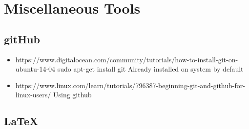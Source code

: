 \documentclass[12pt]{article}
\begin{document}
\section{Miscellaneous Tools}
	\subsection{gitHub}
	\begin{itemize}
		\item https://www.digitalocean.com/community/tutorials/how-to-install-git-on-ubuntu-14-04
		\subitem sudo apt-get install git
		\subitem Already installed on system by default
		\item https://www.linux.com/learn/tutorials/796387-beginning-git-and-github-for-linux-users/
			\subitem Using github
	\end{itemize}
	\subsection{LaTeX}
\end{document}
